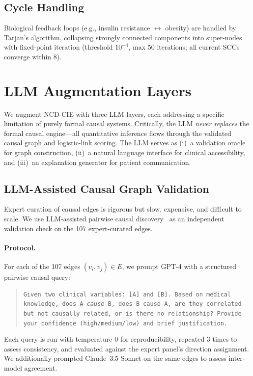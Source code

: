 \documentclass[runningheads]{llncs}
\begin{document}
\subsection{Cycle Handling}\label{sec:cycles}

Biological feedback loops (e.g., insulin resistance
$\leftrightarrow$ obesity) are handled by Tarjan's algorithm,
collapsing strongly connected components into super-nodes with
fixed-point iteration (threshold $10^{-4}$, max 50 iterations;
all current SCCs converge within 8).

\section{LLM Augmentation Layers}\label{sec:llm}

We augment NCD-CIE with three LLM layers, each addressing a
specific limitation of purely formal causal systems.
Critically, the LLM \emph{never replaces} the formal causal
engine---all quantitative inference flows through the
validated causal graph and logistic-link scoring.
The LLM serves as (i)~a validation oracle for graph construction,
(ii)~a natural language interface for clinical accessibility, and
(iii)~an explanation generator for patient communication.

\subsection{LLM-Assisted Causal Graph Validation}\label{sec:llmvalidation}

Expert curation of causal edges is rigorous but slow, expensive,
and difficult to scale.
We use LLM-assisted pairwise causal discovery~\cite{kiciman2023causal}
as an independent validation check on the 107 expert-curated edges.

\paragraph{Protocol.}
For each of the 107 edges $(v_i, v_j) \in E$, we prompt GPT-4
with a structured pairwise causal query:
\begin{quote}
\small\texttt{Given two clinical variables: [A] and [B].
Based on medical knowledge, does A \emph{cause} B, does B cause A,
are they correlated but not causally related, or is there no
relationship? Provide your confidence (high/medium/low) and
brief justification.}
\end{quote}
Each query is run with temperature 0 for reproducibility, repeated
3 times to assess consistency, and evaluated against the expert
panel's direction assignment.
We additionally prompted Claude~3.5 Sonnet on the same edges to
assess inter-model agreement.
\end{document}
